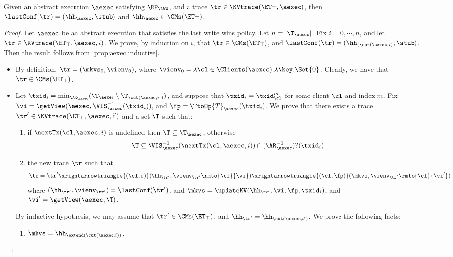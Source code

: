 \begin{proposition}
\label{prop:aexec2kvtrace}
Given an abstract execution $\aexec$ satisfying $\RP_{\LWW}$, 
and a trace $\tr \in \KVtrace(\ET_{\top}, \aexec)$,
then $\lastConf(\tr) = (\hh_{\aexec}, \stub)$ and $\hh_{\aexec} \in \CMs(\ET_{\top})$. 
\end{proposition}
\begin{proof}
Let $\aexec$ be an abstract execution that satisfies the last write wins policy. 
Let $n = \lvert \T_{\aexec} \rvert$. Fix $i =0,\cdots, n$, 
and let $\tr \in \KVtrace(\ET_{\top}, \aexec, i)$. We prove, by 
induction on $i$, that $\tr \in \CMs(\ET_{\top})$, and 
$\lastConf(\tr) = (\hh_{(\cut(\aexec, i)}, \stub)$. 
Then the result follows from  \cref{prop:aexec.inductive}.

\begin{itemize}
\item {} By definition, $\tr = (\mkvs_{0}, \vienv_{0})$, 
where $\vienv_{0} = \lambda \cl \in \Clients(\aexec). \lambda \key.\Set{0}$. 
Clearly, we have that $\tr \in \CMs(\ET_{\top})$. 
\item {} Let $\txid_{i} = \min_{\AR_{\aexec}}(\T_{\aexec} \setminus \T_{\cut(\aexec, i')})$, 
and suppose that $\txid_{i} = \txid_{\cl}^{m}$ for some client $\cl$ and index $m$. 
Fix $\vi = \getView(\aexec, \VIS_{\aexec}^{-1}(\txid_{i}))$, and  $\fp = \TtoOp{T}_{\aexec}(\txid_{i})$.
We prove that there exists a trace $\tr' \in \KVtrace(\ET_{\top}, \aexec, i')$ and a set 
$\T$ such that: 
\begin{enumerate}
\item if $\nextTx(\cl, \aexec, i)$ is undefined then $\T \subseteq \T_{\aexec}$, otherwise 
\[
    \T \subseteq \VIS^{-1}_{\aexec}(\nextTx(\cl, \aexec, i)) \cap (\AR_{\aexec}^{-1})?(\txid_{i})
\]
\item the new trace \( \tr \) such that
\[
\tr = \tr' \xrightarrowtriangle{(\cl, \varepsilon)} (\hh_{\tr'}, \vienv_{\tr'}\rmto{\cl}{\vi}) \xrightarrowtriangle{(\cl, \fp)} 
(\mkvs,  \vienv_{\tr'}\rmto{\cl}{\vi'})
\]
where $(\hh_{\tr'}, \vienv_{\tr'}) = \lastConf(\tr')$, and $\mkvs = \updateKV(\hh_{\tr'}, \vi, \fp, \txid_{i})$, 
and $\vi' = \getView(\aexec, \T)$.
\end{enumerate}
By inductive hypothesis, we may assume that $\tr' \in \CMs(\ET_{\top})$, and $\hh_{\tr'} = \hh_{\cut(\aexec, i')}$. 
We prove the following facts: 
\begin{enumerate}
\item $\mkvs = \hh_{\extend(\cut(\aexec, i))}$. 

\end{enumerate}
\end{itemize}
\end{proof}
